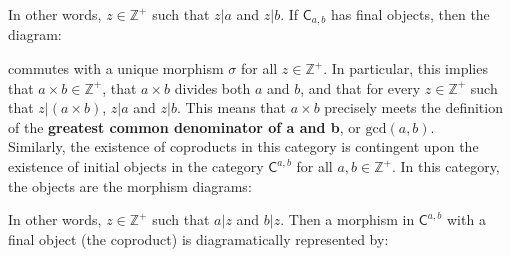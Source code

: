 \documentclass[11pt,a4paper]{article}
\begin{document}
\begin{center}
\end{center}

\noindent In other words, $z \in \mathbb{Z}^+$ such that $z|a$ and $z|b$.  If $\textsf{C}_{a,b}$ has final objects, then the diagram:

 \begin{center}
\end{center} 

\noindent commutes with a unique morphism $\sigma$ for all $z \in \mathbb{Z}^+$.  In particular, this implies that $a \times b \in \mathbb{Z}^+$, that $a \times b$ divides both $a$ and $b$, and that for every $z \in \mathbb{Z}^+$ such that $z|(a\times b)$, $z|a$ and $z|b$.  This means that $a \times b$ precisely meets the definition of the \textbf{greatest common denominator of a and b}, or $\text{gcd}(a,b)$. \\

\noindent Similarly, the existence of coproducts in this category is contingent upon the existence of initial objects in the category $\textsf{C}^{a,b}$ for all $a,b \in \mathbb{Z}^+$.  In this category, the objects are the morphism diagrams:

\begin{center}
\end{center}
 
\noindent In other words, $z \in \mathbb{Z}^+$ such that $a|z$ and $b|z$.  Then a morphism in $\textsf{C}^{a,b}$ with a final object (the coproduct) is diagramatically represented by:

\begin{center}
\end{center}
\end{document}
